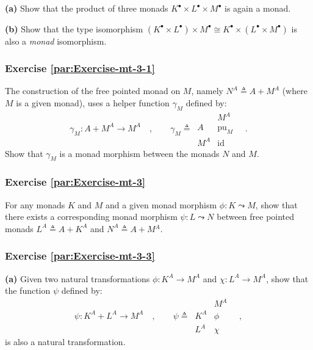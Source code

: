 \textbf{(a)} Show that the product of three monads $K^{\bullet}\times L^{\bullet}\times M^{\bullet}$
is again a monad.

\textbf{(b)} Show that the type isomorphism $(K^{\bullet}\times L^{\bullet})\times M^{\bullet}\cong K^{\bullet}\times(L^{\bullet}\times M^{\bullet})$
is also a \emph{monad} isomorphism.

\subsubsection{Exercise \label{par:Exercise-mt-3-1}\ref{par:Exercise-mt-3-1}}

The construction of the free pointed monad on $M$, namely $N^{A}\triangleq A+M^{A}$
(where $M$ is a given monad), uses a helper function $\gamma_{M}$
defined by:
\[
\gamma_{M}:A+M^{A}\rightarrow M^{A}\quad,\quad\quad\gamma_{M}\triangleq\,\begin{array}{|c||c|}
 & M^{A}\\
\hline A & \text{pu}_{M}\\
M^{A} & \text{id}
\end{array}\quad.
\]
Show that $\gamma_{M}$ is a monad morphism between the monads $N$
and $M$.

\subsubsection{Exercise \label{par:Exercise-mt-3}\ref{par:Exercise-mt-3}}

For any monads $K$ and $M$ and a given monad morphism $\phi:K\leadsto M$,
show that there exists a corresponding monad morphism $\psi:L\leadsto N$
between free pointed monads $L^{A}\triangleq A+K^{A}$ and $N^{A}\triangleq A+M{}^{A}$.

\subsubsection{Exercise \label{par:Exercise-mt-3-3}\ref{par:Exercise-mt-3-3}}

\textbf{(a)} Given two natural transformations $\phi:K^{A}\rightarrow M^{A}$
and $\chi:L^{A}\rightarrow M^{A}$, show that the function $\psi$
defined by:
\[
\psi:K^{A}+L^{A}\rightarrow M^{A}\quad,\quad\quad\psi\triangleq\,\begin{array}{|c||c|}
 & M^{A}\\
\hline K^{A} & \phi\\
L^{A} & \chi
\end{array}\quad,
\]
 is also a natural transformation.

